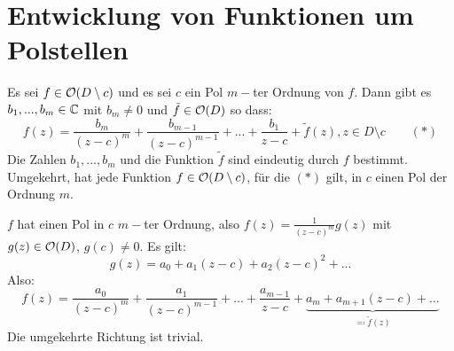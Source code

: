\section{Entwicklung von Funktionen um Polstellen}
\begin{satz}
	Es sei $ f\in\mathcal O(D\setminus c) $ und es sei $ c $ ein Pol $ m- $ter Ordnung von $ f $. Dann gibt es $ b_1,...,b_m\in\mathbb{C} $ mit $ b_m\neq 0 $ und $ \tilde f\in\mathcal O(D) $  so dass:
	\[ f(z)=\frac{b_m}{(z-c)^m}+\frac{b_{m-1}}{(z-c)^{m-1}}+...+\frac{b_1}{z-c}+\tilde f(z), z\in D\setminus c\qquad (\ast) \]
	Die Zahlen $ b_1,...,b_m $ und die Funktion $ \tilde f $ sind eindeutig durch $ f $ bestimmt.\\
	Umgekehrt, hat jede Funktion $ f\in\mathcal O(D\setminus c) $, f\"ur die $ (\ast) $ gilt, in $ c $ einen Pol der Ordnung $ m $.
\end{satz}
\begin{beweis}
	$ f $ hat einen Pol in $ c $ $ m- $ter Ordnung, also $ f(z)=\frac{1}{(z-c)^m}g(z) $ mit $ g(z)\in\mathcal O(D) $, $ g(c)\neq 0 $. Es gilt:
	\[ g(z)=a_0+a_1(z-c)+a_2(z-c)^2+... \]
	Also:
	\[ f(z)=\frac{a_0}{(z-c)^m}+\frac{a_1}{(z-c)^{m-1}}+...+\frac{a_{m-1}}{z-c}+\underbrace{a_m+a_{m+1}(z-c)+...}_{\eqqcolon\tilde f(z)} \]
	Die umgekehrte Richtung ist trivial.
\end{beweis}